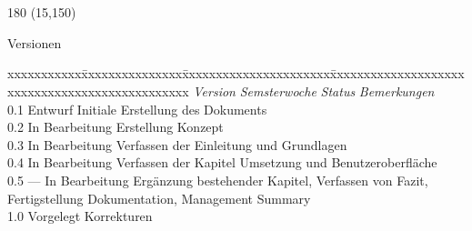 \chapter*{}
\label{chap:versionen}

\begin{textblock}{180} (15,150)
\color{black}
\begin{huge}
Versionen
\end{huge}
\vspace{10mm}

\fontsize{10pt}{18pt}\selectfont
\begin{tabbing}
xxxxxxxxxxx\=xxxxxxxxxxxxxxx\=xxxxxxxxxxxxxxxxxxxxxx\=xxxxxxxxxxxxxxxxxxxxxxxxxxxxxxxxxxxxxxxxxxxxxxx \kill
\textit{Version}	\> \textit{Semsterwoche}	\> \textit{Status}		\> \textit{Bemerkungen}\\
0.1		\> Entwurf			\> Initiale Erstellung des Dokuments\\
0.2		\> In Bearbeitung	\> Erstellung Konzept\\
0.3		\> In Bearbeitung	\> Verfassen der Einleitung und Grundlagen\\
0.4		\> In Bearbeitung	\> Verfassen der Kapitel Umsetzung und Benutzeroberfläche\\
0.5	\> ---	\> In Bearbeitung	\> Ergänzung bestehender Kapitel, Verfassen von Fazit,\\
	\>		\>					\> Fertigstellung Dokumentation, Management Summary\\
1.0		\> Vorgelegt		\> Korrekturen\\
\end{tabbing}

\end{textblock}
